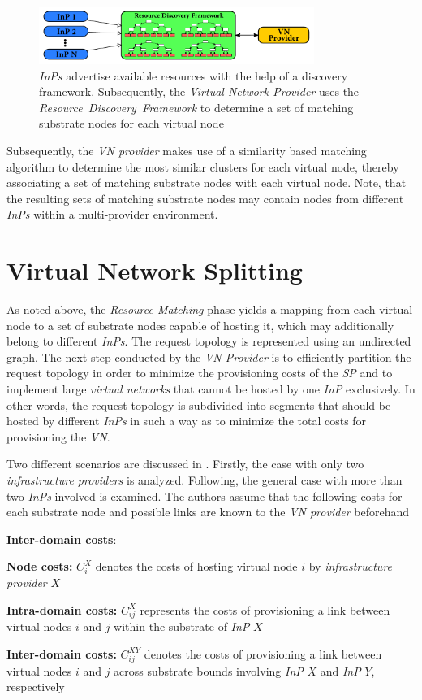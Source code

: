\documentclass[prodmode,acmtomccap]{acmlarge}
\begin{document}
\begin{figure}[htb]
	\centering
	\includegraphics[width=0.8\textwidth]{rdf}
	\caption{\emph{InPs} advertise available resources with the help of a discovery framework. 
		Subsequently,  the \emph{Virtual Network Provider} uses the \emph{Resource~Discovery~Framework} to determine a set of matching substrate nodes for each virtual node}
	\label{fig4}
\end{figure}

Subsequently, the \emph{VN provider} makes use of a similarity based matching algorithm to determine the most similar clusters for each virtual node, thereby associating a set of matching substrate
nodes with each virtual node. Note, that the resulting sets of matching substrate nodes may contain nodes from different \emph{InPs} within a multi-provider environment.

\section{Virtual Network Splitting}
\label{sec:splitting}
As noted above, the \emph{Resource Matching} phase yields a mapping from each virtual node to a set of substrate nodes capable of hosting it, which may additionally belong to different \emph{InPs}.
The request topology is represented using an undirected graph. 
The next step conducted by the \emph{VN Provider} is to efficiently partition the request topology in order to minimize the provisioning costs of the \emph{SP} and to implement large \emph{virtual networks}
that cannot be hosted by one \emph{InP} exclusively. In other words, the request topology is subdivided into segments that should be hosted by different \emph{InPs} in such a way as to
minimize the total costs for provisioning the \emph{VN}.

Two different scenarios are discussed in . Firstly, the case with only two \emph{infrastructure providers} is analyzed. Following, the general case with more than two \emph{InPs} involved
is examined. The authors assume that the following costs for each substrate node and possible links are known to the \emph{VN provider} beforehand

\begin{describe}{{\bfseries Inter-domain costs\/}:}
	\item[\bfseries Node costs:] $C_i^X$ denotes the costs of hosting virtual node $i$ by \emph{infrastructure provider} $X$ 
	\item[\bfseries Intra-domain costs:] $C_{ij}^X$ represents the costs of provisioning a link between virtual nodes $i$ and $j$ within the substrate of \emph{InP} $X$ 
	\item[\bfseries Inter-domain costs:] $C_{ij}^{XY}$ denotes the costs of provisioning a link between virtual nodes $i$ and $j$ across substrate bounds involving \emph{InP} $X$ and \emph{InP} $Y$, respectively	
\end{describe}
\end{document}
